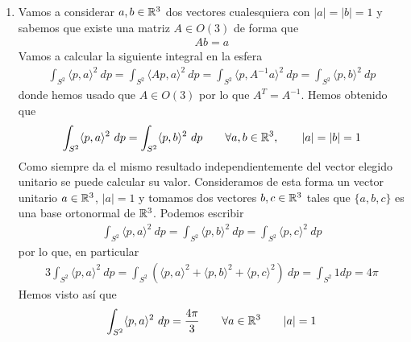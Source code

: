 \begin{ejemplo}
\begin{enumerate}
        \item Vamos a considerar $a,b\in \mathbb{R}^3$ dos vectores cualesquiera con $|a| = |b| = 1$ y sabemos que existe una matriz $A\in O(3)$ de forma que 
        \begin{gather*}
            Ab = a
        \end{gather*}
        Vamos a calcular la siguiente integral en la esfera
        \begin{gather*}
            \int_{S^2} \langle p,a \rangle^2\ dp = \int_{S^2} \langle Ap, a \rangle^2\ dp = \int_{S^2} \langle p, A^{-1}a\rangle^2\ dp = \int_{S^2} \langle p, b \rangle^2\ dp
        \end{gather*}
        donde hemos usado que $A\in O(3)$ por lo que $A^T = A^{-1}$. Hemos obtenido que 
        \begin{gather*}
            \int_{S^2} \langle p, a \rangle^2\ dp = \int_{S^2} \langle p, b \rangle^2\ dp \qquad \forall a, b\in \mathbb{R}^3, \qquad |a|=|b|=1
        \end{gather*}
        Como siempre da el mismo resultado independientemente del vector elegido unitario se puede calcular su valor. Consideramos de esta forma un vector unitario $a\in \mathbb{R}^3$, $|a|=1$ y tomamos dos vectores $b,c\in \mathbb{R}^3$ tales que $\{a,b,c\}$ es una base ortonormal de $\mathbb{R}^3$. Podemos escribir
        \begin{gather*}
            \int_{S^2} \langle p, a \rangle^2\ dp = \int_{S^2} \langle p, b \rangle^2\ dp = \int_{S^2} \langle p, c \rangle^2\ dp
        \end{gather*}
        por lo que, en particular
        \begin{gather*}
            3\int_{S^2} \langle p, a \rangle^2\ dp = \int_{S^2} (\langle p, a \rangle^2 + \langle p, b \rangle^2 + \langle p, c \rangle^2)\ dp = \int_{S^2} 1 dp = 4\pi
        \end{gather*}
        Hemos visto así que 
        \begin{gather*}
            \int_{S^2} \langle p,a\rangle^2\ dp = \frac{4\pi}{3} \qquad \forall a \in \mathbb{R}^3\qquad |a|=1
        \end{gather*}


\end{enumerate}
\end{ejemplo}
